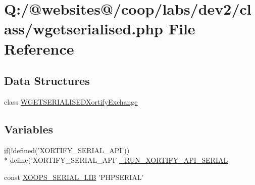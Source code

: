 \hypertarget{wgetserialised_8php}{\section{Q\-:/@websites@/coop/labs/dev2/class/wgetserialised.php File Reference}
\label{wgetserialised_8php}
}
\subsection*{Data Structures}
\begin{DoxyCompactItemize}
\item 
class \hyperlink{class_w_g_e_t_s_e_r_i_a_l_i_s_e_d_xortify_exchange}{W\-G\-E\-T\-S\-E\-R\-I\-A\-L\-I\-S\-E\-D\-Xortify\-Exchange}
\end{DoxyCompactItemize}
\subsection*{Variables}
\begin{DoxyCompactItemize}
\item 
\hyperlink{index_8php_ae2ccdf355624402b65fc2226f2a661cd}{if}(!defined('X\-O\-R\-T\-I\-F\-Y\-\_\-\-S\-E\-R\-I\-A\-L\-\_\-\-A\-P\-I')) \\*
define('X\-O\-R\-T\-I\-F\-Y\-\_\-\-S\-E\-R\-I\-A\-L\-\_\-\-A\-P\-I' \hyperlink{wgetserialised_8php_ab746ef4fb6a200e074c96e76169601a4}{\-\_\-\-R\-U\-N\-\_\-\-X\-O\-R\-T\-I\-F\-Y\-\_\-\-A\-P\-I\-\_\-\-S\-E\-R\-I\-A\-L}
\item 
const \hyperlink{wgetserialised_8php_a70ad743fdbf705daf2366b5cabf7a04d}{X\-O\-O\-P\-S\-\_\-\-S\-E\-R\-I\-A\-L\-\_\-\-L\-I\-B} 'P\-H\-P\-S\-E\-R\-I\-A\-L'
\end{DoxyCompactItemize}


